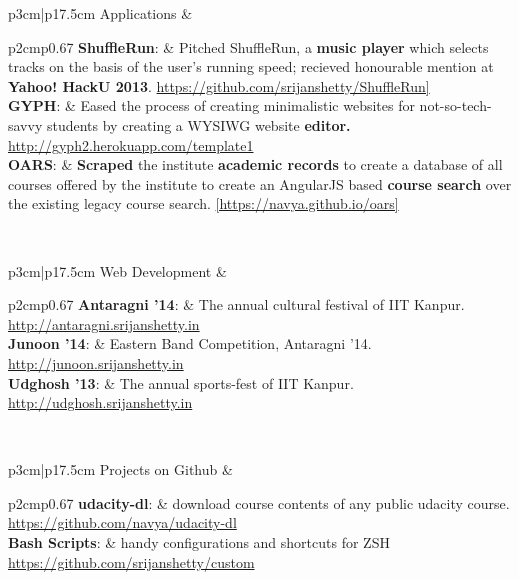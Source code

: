 \documentclass[a4paper]{article} %
\newcommand{\projectlist}[2]{
    \vspace{0.2cm}
    \begin{tabular}{p{3cm}|p{17.5cm}}
        \textcolor{NavyBlue}{#1} & \footnotesize{#2}\\
    \end{tabular}
}
\begin{document}
\projectlist
    {Applications}
    {
        \begin{tabular}{p{2cm}p{0.67\linewidth}}
            \textbf{ShuffleRun}:
            & Pitched ShuffleRun, a \textbf{music player} which selects tracks on the basis of the user's
            running speed; recieved honourable mention at \textbf{Yahoo! HackU 2013}.
            \href{https://github.com/srijanshetty/ShuffleRun} {https://github.com/srijanshetty/ShuffleRun]}\\

            \textbf{GYPH}:
            & Eased the process of creating minimalistic websites for not-so-tech-savvy students
            by creating a WYSIWG website \textbf{editor.} \href{http://gyph2.herokuapp.com/template1}
            {http://gyph2.herokuapp.com/template1}\\

            \textbf{OARS}:
            & \textbf{Scraped} the institute \textbf{academic records} to create a database of all courses offered by the
            institute to create an AngularJS based \textbf{course search} over the existing legacy course search.
            {\href{https://navya.github.io/oars}{\footnotesize{[https://navya.github.io/oars]}}}
         \end{tabular}
     }

\projectlist
    {Web Development}
    {
        \begin{tabular}{p{2cm}p{0.67\linewidth}}
             \textbf{Antaragni '14}: & The annual cultural festival of IIT Kanpur.
             \href{http://antaragni.srijanshetty.in} {http://antaragni.srijanshetty.in}\\
             \textbf{Junoon '14}: & Eastern Band Competition, Antaragni '14.
             \href{http://junoon.srijanshetty.in}{http://junoon.srijanshetty.in}\\
            \textbf{Udghosh '13}: & The annual sports-fest of IIT Kanpur.
             \href{http://udghosh.srijanshetty.in}{http://udghosh.srijanshetty.in}\\
         \end{tabular}
    }

\projectlist
    {Projects on Github}
    {
        \begin{tabular}{p{2cm}p{0.67\linewidth}}
             \textbf{udacity-dl}: & download course contents of any public udacity course.
             \href{https://github.com/navya/udacity-dl} {https://github.com/navya/udacity-dl}\\
             \textbf{Bash Scripts}: & handy configurations and shortcuts for ZSH
             \href{https://github.com/srijanshetty/custom} {https://github.com/srijanshetty/custom}\\
         \end{tabular}
    }
\end{document}
